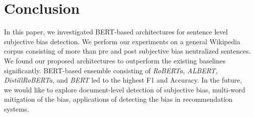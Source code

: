 \documentclass[sigconf,nonacm]{acmart}
\begin{document}
\begin{table}[t]
\centering
{}
\caption{Experimental Results for the Subjectivity Detection Task}
\label{tab:experimental-results}
\end{table}


\section{Conclusion}
In this paper, we investigated BERT-based architectures for sentence level subjective bias detection. We perform our experiments on a general Wikipedia corpus consisting of more than  pre and post subjective bias neutralized sentences. We found our proposed architectures to outperform the existing baselines significantly. BERT-based ensemble consisting of \textit{RoBERTa}, \textit{ALBERT}, \textit{DistillRoBERTa}, and \textit{BERT} led to the highest F1 and Accuracy. In the future, we would like to explore document-level detection of subjective bias, multi-word mitigation of the bias, applications of detecting the bias in recommendation systems. 




\end{document}
